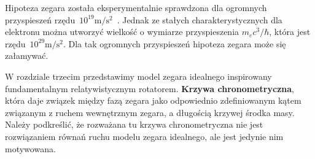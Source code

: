 Hipoteza zegara 
została eksperymentalnie sprawdzona dla ogromnych 
przyspieszeń 
rzędu~$10^{19}\si{\metre\per\second^2}$~\cite{Bailey1977}. Jednak 
ze stałych charakterystycznych dla elektronu 
można utworzyć wielkość o wymiarze przyspieszenia $m_e c^3/\hbar$, 
która jest rzędu~$10^{29}\si{\metre\per\second^2}$. Dla 
tak ogromnych przyspieszeń hipoteza zegara może się załamywać.

W rozdziale trzecim przedstawimy model zegara idealnego inspirowany
fundamentalnym relatywistycznym rotatorem. 
\textbf{Krzywa chronometryczna}, 
która daje związek między fazą zegara jako 
odpowiednio zdefiniowanym kątem związanym z ruchem 
wewnętrznym zegara, a długością krzywej 
środka masy. Należy podkreślić, że rozważana 
tu krzywa chronometryczna nie jest rozwiązaniem równań ruchu 
modelu zegara idealnego, ale jest jedynie nim motywowana.

